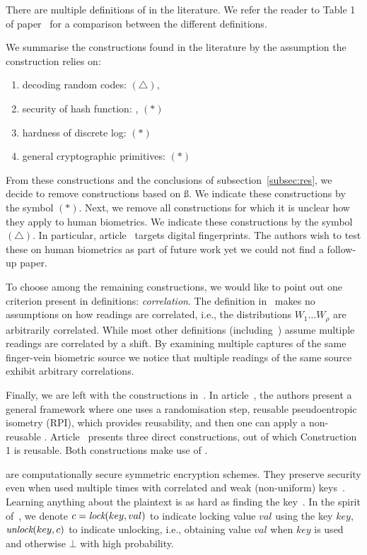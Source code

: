 There are multiple definitions of \rfe in the literature. We refer the reader to Table 1 of paper~\cite{reusablefe} for a comparison between the different definitions.

We summarise the \rfe constructions found in the literature by the assumption the construction relies on:
\begin{enumerate}
    \item decoding random codes: \cite{puf} $(\triangle)$, \cite{lwe}
    \item security of hash function: \cite{reusablefe,rpi}, \cite{boyen} $(\ast)$
    \item hardness of discrete log: \cite{wlh, wl} $(\ast)$
    \item general cryptographic primitives: \cite{wlg} $(\ast)$
\end{enumerate}


From these constructions and the conclusions of subsection~\ref{subsec:res}, we decide to remove constructions based on \ss. We indicate these constructions by the symbol $(\ast)$.
Next, we remove all constructions for which it is unclear how they apply to human biometrics. We indicate these constructions by the symbol $(\triangle)$. In particular, article~\cite{puf} targets digital fingerprints. The authors wish to test these on human biometrics as part of future work yet we could not find a follow-up paper.

To choose among the remaining constructions, we would like to point out one criterion present in \rfe definitions: \textit{correlation}. 
The \rfe definition in~\cite{reusablefe} makes no assumptions on how readings are correlated, i.e., the distributions $W_1 \dots W_\rho$ are arbitrarily correlated. While most other definitions (including~\cite{lwe}) assume multiple readings are correlated by a shift.
By examining multiple captures of the same finger-vein biometric source we notice that multiple readings of the same source exhibit arbitrary correlations.

Finally, we are left with the constructions in~\cite{reusablefe,rpi}.
In article~\cite{rpi}, the authors present a general framework where one uses a randomisation step, reusable pseudoentropic isometry (RPI), which provides reusability, and then one can apply a non-reusable \fe. Article~\cite{reusablefe} presents three direct constructions, out of which Construction 1 is reusable.
Both constructions make use of \dls.

\dls are computationally secure symmetric encryption schemes. They preserve security even when used multiple times with correlated and weak (non-uniform) keys~\cite{reusablefe,rpi}.
Learning anything about the plaintext is as hard as finding the key~\cite{reusablefe}.
In the spirit of~\cite{reusablefe,rpi}, we denote $c=\textit{lock}(key,val)$ to indicate locking value $val$ using the key $key$, $\textit{unlock}(key,c)$ to indicate unlocking, i.e., obtaining value $val$ when $key$ is used and otherwise $\bot$ with high probability.

